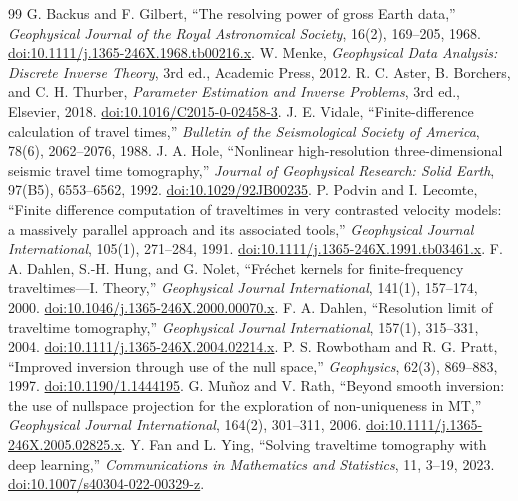 \documentclass[11pt]{article}
\begin{document}
{\small
\begin{thebibliography}{99}
 G. Backus and F. Gilbert, ``The resolving power of gross Earth data,'' \emph{Geophysical Journal of the Royal Astronomical Society}, 16(2), 169--205, 1968. \href{https://doi.org/10.1111/j.1365-246X.1968.tb00216.x}{doi:10.1111/j.1365-246X.1968.tb00216.x}.
 W. Menke, \emph{Geophysical Data Analysis: Discrete Inverse Theory}, 3rd ed., Academic Press, 2012.
 R. C. Aster, B. Borchers, and C. H. Thurber, \emph{Parameter Estimation and Inverse Problems}, 3rd ed., Elsevier, 2018. \href{https://doi.org/10.1016/C2015-0-02458-3}{doi:10.1016/C2015-0-02458-3}.
 J. E. Vidale, ``Finite-difference calculation of travel times,'' \emph{Bulletin of the Seismological Society of America}, 78(6), 2062--2076, 1988.
 J. A. Hole, ``Nonlinear high-resolution three-dimensional seismic travel time tomography,'' \emph{Journal of Geophysical Research: Solid Earth}, 97(B5), 6553--6562, 1992. \href{https://doi.org/10.1029/92JB00235}{doi:10.1029/92JB00235}.
 P. Podvin and I. Lecomte, ``Finite difference computation of traveltimes in very contrasted velocity models: a massively parallel approach and its associated tools,'' \emph{Geophysical Journal International}, 105(1), 271--284, 1991. \href{https://doi.org/10.1111/j.1365-246X.1991.tb03461.x}{doi:10.1111/j.1365-246X.1991.tb03461.x}.
 F. A. Dahlen, S.-H. Hung, and G. Nolet, ``Fr\'echet kernels for finite-frequency traveltimes---I. Theory,'' \emph{Geophysical Journal International}, 141(1), 157--174, 2000. \href{https://doi.org/10.1046/j.1365-246X.2000.00070.x}{doi:10.1046/j.1365-246X.2000.00070.x}.
 F. A. Dahlen, ``Resolution limit of traveltime tomography,'' \emph{Geophysical Journal International}, 157(1), 315--331, 2004. \href{https://doi.org/10.1111/j.1365-246X.2004.02214.x}{doi:10.1111/j.1365-246X.2004.02214.x}.
 P. S. Rowbotham and R. G. Pratt, ``Improved inversion through use of the null space,'' \emph{Geophysics}, 62(3), 869--883, 1997. \href{https://doi.org/10.1190/1.1444195}{doi:10.1190/1.1444195}.
 G. Mu\~noz and V. Rath, ``Beyond smooth inversion: the use of nullspace projection for the exploration of non-uniqueness in MT,'' \emph{Geophysical Journal International}, 164(2), 301--311, 2006. \href{https://doi.org/10.1111/j.1365-246X.2005.02825.x}{doi:10.1111/j.1365-246X.2005.02825.x}.
 Y. Fan and L. Ying, ``Solving traveltime tomography with deep learning,'' \emph{Communications in Mathematics and Statistics}, 11, 3--19, 2023. \href{https://doi.org/10.1007/s40304-022-00329-z}{doi:10.1007/s40304-022-00329-z}.

\end{thebibliography}}
\end{document}
